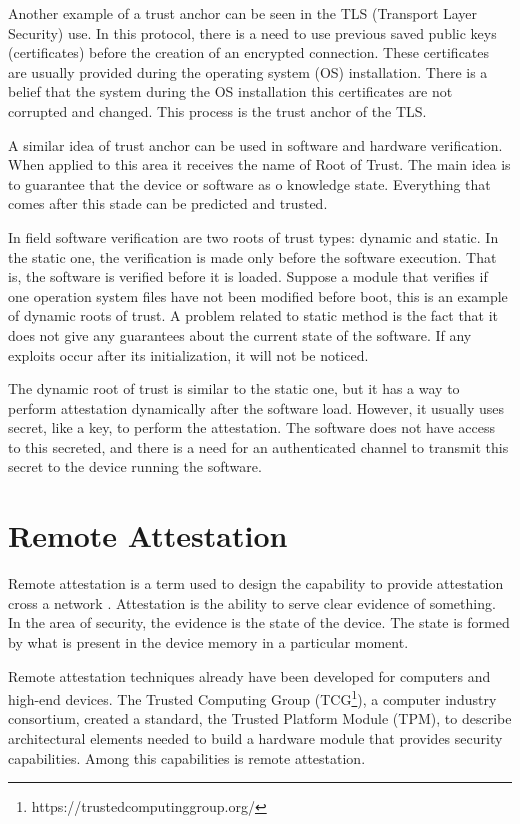 Another example of a trust anchor can be seen in the TLS (Transport Layer Security) use. In this protocol, there is a need to use previous saved public keys (certificates) before the creation of an encrypted connection. These certificates are usually provided during the operating system (OS) installation. There is a belief that the system during the OS installation this certificates are not corrupted and changed.  This process is the trust anchor of the TLS.

A similar idea of trust anchor can be used in software and hardware verification. When applied to this area it receives the name of Root of Trust. The main idea is to guarantee that the device or software as o knowledge state. Everything that comes after this stade can be predicted and trusted. 

In field software verification are two roots of trust types\cite{minimalistaproacRA}: dynamic and static. In the static one, the verification is made only before the software execution. That is, the software is verified before it is loaded. Suppose a module that verifies if one operation system files have not been modified before boot, this is an example of dynamic roots of trust. A problem related to static method is the fact that it does not give any guarantees about the current state of the software. If any exploits occur after its initialization, it will not be noticed.

The dynamic root of trust is similar to the static one, but it has a way to perform attestation dynamically after the software load. However, it usually uses secret, like a key, to perform the attestation. The software does not have access to this secreted, and there is a need for an authenticated channel to transmit this secret to the device running the software.

\section{Remote Attestation}

Remote attestation is a term used to design the capability to provide attestation cross a network \cite{minimalistaproacRA}. Attestation is the ability to serve clear evidence of something. In the area of security, the evidence is the state of the device. The state is formed by what is present in the device memory in a particular moment.

Remote attestation techniques already have been developed for computers and high-end devices. The Trusted Computing Group (TCG\footnote{https://trustedcomputinggroup.org/}), a computer industry consortium, created a standard, the Trusted Platform Module (TPM\cite{tpm}), to describe architectural elements needed to build a hardware module that provides security capabilities. Among this capabilities is remote attestation.

